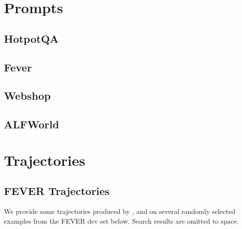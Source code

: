 \section{Prompts}
\label{sec:prompts}
\subsection{HotpotQA}


\subsection{Fever}


\subsection{Webshop}


\subsection{ALFWorld}
\label{appendix:ALFWorld_prompts}


\section{Trajectories}

\subsection{FEVER Trajectories}
\label{sec:fever_trajs}
We provide some trajectories produced by \model, \reason and \act on several randomly selected examples from the FEVER dev set below. Search results are omitted to  space.

\newcommand{\reactA}{
Claim: & Bermuda Triangle is a loosely-defined region in the Pacific Ocean. \\
Thought 1: & I need to search Bermuda Triangle and find if it is in the Pacific Ocean. \\
Action 1: & Search[Bermuda Triangle] \\
Observation 1: & Reportedly haunted locations... \\
Thought 2: & The observation says that it is in the western part of the North Atlantic Ocean, so it is not in the Pacific Ocean. \\
Action 2: & Finish[REFUTES] \\
Observation 2: & Episode finished\\}

